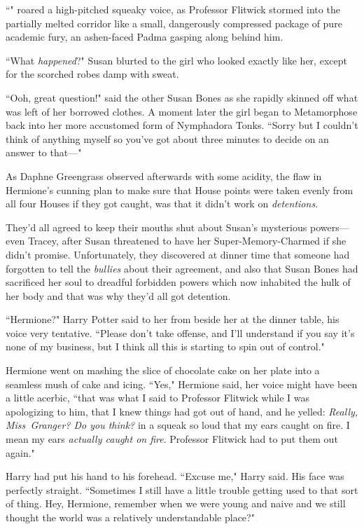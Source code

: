 ``" roared a high-pitched squeaky voice, as Professor Flitwick stormed into the partially melted corridor like a small, dangerously compressed package of pure academic fury, an ashen-faced Padma gasping along behind him.

\later

``What \emph{happened}?" Susan blurted to the girl who looked exactly like her, except for the scorched robes damp with sweat.

``Ooh, great question!" said the other Susan Bones as she rapidly skinned off what was left of her borrowed clothes. A moment later the girl began to Metamorphose back into her more accustomed form of Nymphadora Tonks. ``Sorry but I couldn't think of anything myself so you've got about three minutes to decide on an answer to that—"

\later

As Daphne Greengrass observed afterwards with some acidity, the flaw in Hermione's cunning plan to make sure that House points were taken evenly from all four Houses if they got caught, was that it didn't work on \emph{detentions}.

They'd all agreed to keep their mouths shut about Susan's mysterious powers—even Tracey, after Susan threatened to have her Super-Memory-Charmed if she didn't promise. Unfortunately, they discovered at dinner time that someone had forgotten to tell the \emph{bullies} about their agreement, and also that Susan Bones had sacrificed her soul to dreadful forbidden powers which now inhabited the hulk of her body and that was why they'd all got detention.

``Hermione?" Harry Potter said to her from beside her at the dinner table, his voice very tentative. ``Please don't take offense, and I'll understand if you say it's none of my business, but I think all this is starting to spin out of control."

Hermione went on mashing the slice of chocolate cake on her plate into a seamless mush of cake and icing. ``Yes," Hermione said, her voice might have been a little acerbic, ``that was what I said to Professor Flitwick while I was apologizing to him, that I knew things had got out of hand, and he yelled: \emph{Really, Miss~Granger? Do you think?} in a squeak so loud that my ears caught on fire. I mean my ears \emph{actually caught on fire}. Professor Flitwick had to put them out again."

Harry had put his hand to his forehead. ``Excuse me," Harry said. His face was perfectly straight. ``Sometimes I still have a little trouble getting used to that sort of thing. Hey, Hermione, remember when we were young and naive and we still thought the world was a relatively understandable place?"

